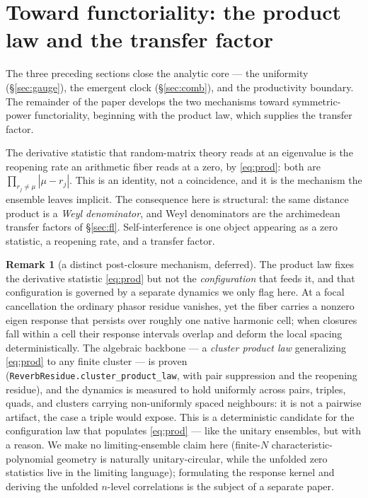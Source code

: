 \documentclass[11pt]{article}
\theoremstyle{definition}
\newtheorem{remark}[theorem]{Remark}
\begin{document}
\section{Toward functoriality: the product law and the transfer factor}\label{sec:gue}

The three preceding sections close the analytic core --- the uniformity (\S\ref{sec:gauge}), the
emergent clock (\S\ref{sec:comb}), and the productivity boundary. The remainder of the paper develops
the two mechanisms toward symmetric-power functoriality, beginning with the product law, which supplies
the transfer factor.

The derivative statistic that random-matrix theory reads at an eigenvalue is the reopening rate an
arithmetic fiber reads at a zero, by \eqref{eq:prod}: both are $\prod_{r_j\neq\mu}|\mu-r_j|$. This is
an identity, not a coincidence, and it is the mechanism the ensemble leaves implicit. The consequence
here is structural: the same distance product is a \emph{Weyl denominator}, and Weyl denominators are
the archimedean transfer factors of \S\ref{sec:fl}. Self-interference is one object appearing as a
zero statistic, a reopening rate, and a transfer factor.

\begin{remark}[a distinct post-closure mechanism, deferred]\label{rem:reverb}
The product law fixes the derivative statistic \eqref{eq:prod} but not the \emph{configuration} that
feeds it, and that configuration is governed by a separate dynamics we only flag here. At a focal
cancellation the ordinary phasor residue vanishes, yet the fiber carries a nonzero eigen response that
persists over roughly one native harmonic cell; when closures fall within a cell their response
intervals overlap and deform the local spacing deterministically. The algebraic backbone --- a
\emph{cluster product law} generalizing \eqref{eq:prod} to any finite cluster --- is proven
(\texttt{ReverbResidue.cluster\_product\_law}, with pair suppression and the reopening residue), and
the dynamics is measured to hold uniformly across pairs, triples, quads, and clusters carrying
non-uniformly spaced neighbours: it is not a pairwise artifact, the case a triple would expose. This is
a deterministic candidate for the configuration law that populates \eqref{eq:prod} --- like the
unitary ensembles, but with a reason. We make no limiting-ensemble claim here (finite-$N$
characteristic-polynomial geometry is naturally unitary-circular, while the unfolded zero statistics
live in the limiting language); formulating the response kernel and deriving the unfolded $n$-level
correlations is the subject of a separate paper.
\end{remark}
\end{document}
